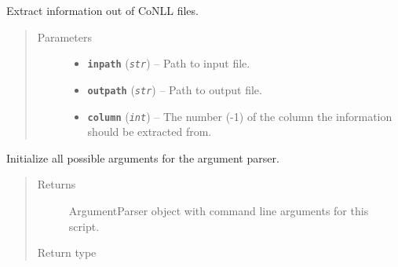 \documentclass[letterpaper,10pt,english]{sphinxmanual}
\begin{document}
\begin{fulllineitems}
\label{src.prep.corpus:src.prep.corpus.extract_conll.extract_conll}
Extract information out of CoNLL files.
\begin{quote}\begin{description}
\item[{Parameters}] \leavevmode\begin{itemize}
\item {} 
\textbf{\texttt{inpath}} (\emph{\texttt{str}}) -- Path to input file.

\item {} 
\textbf{\texttt{outpath}} (\emph{\texttt{str}}) -- Path to output file.

\item {} 
\textbf{\texttt{column}} (\emph{\texttt{int}}) -- The number (-1) of the column the information should be extracted from.

\end{itemize}

\end{description}\end{quote}

\end{fulllineitems}


\begin{fulllineitems}
\label{src.prep.corpus:src.prep.corpus.extract_conll.init_argparse}
Initialize all possible arguments for the argument parser.
\begin{quote}\begin{description}
\item[{Returns}] \leavevmode
ArgumentParser object with command line arguments for this script.

\item[{Return type}] \leavevmode
{}

\end{description}\end{quote}

\end{fulllineitems}

\end{document}
